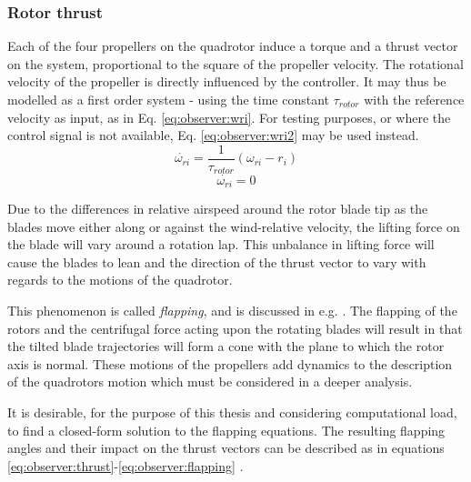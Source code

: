 \subsubsection{Rotor thrust}
\label{ssec:observer:thrust}
    Each of the four propellers on the quadrotor induce a torque
    and a thrust vector on the system, proportional to the square of the
    propeller velocity. The rotational velocity of the propeller is directly
    influenced by the controller. It may thus be modelled as a first order system - using the time constant $\tau_{rotor}$ with
    the reference velocity as input, as in Eq. \eqref{eq:observer:wri}.
    For testing purposes, or where the control signal is not available, Eq. \eqref{eq:observer:wri2} may be used instead.
    \begin{equation}
        \label{eq:observer:wri}
        \dot{\omega_{ri}} = \frac{1}{\tau_{rotor}} \left( \omega_{ri} - r_{i} \right)
    \end{equation}
    \begin{equation}
        \label{eq:observer:wri2}
        \dot{\omega_{ri}} = 0
    \end{equation}

    Due to the differences in relative airspeed around
    the rotor blade tip as the blades move either along or against
    the wind-relative velocity, the lifting force on the blade will vary
    around a rotation lap.
    This unbalance in lifting force will cause the blades to lean and the
    direction of the thrust vector to vary with regards to the motions of the quadrotor.

    This phenomenon is called \textit{flapping}, and is discussed
    in e.g. \citep{Pounds_modellingand}. The flapping of the rotors
    and the centrifugal force acting upon the rotating blades
    will result in that the tilted blade trajectories will
    form a cone with the plane to which the rotor axis is normal.
    These motions of the propellers add dynamics to the
    description of the quadrotors motion which must be considered in a deeper analysis.

    It is desirable, for the purpose of this thesis and
    considering computational load, to find a closed-form
    solution to the flapping equations.
    The resulting flapping angles and their impact on
    the thrust vectors can be described as in equations
    \eqref{eq:observer:thrust}-\eqref{eq:observer:flapping}
    \citep{Pounds_modellingand,prouty1995helicopter,leishman2002principles}.


